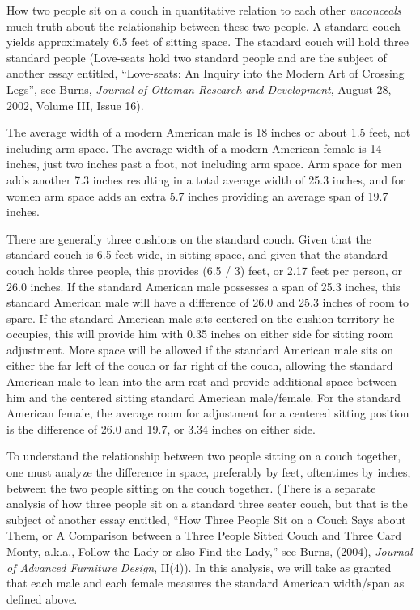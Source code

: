 \documentclass[12pt]{article}
\begin{document}

How two people sit on a couch in quantitative relation to each
other \textit{unconceals} much truth about the relationship
between these two people. A standard couch yields approximately
6.5 feet of sitting space. The standard couch will hold three
standard people (Love-seats hold two standard people and are the
subject of another essay entitled, ``Love-seats: An Inquiry into
the Modern Art of Crossing Legs'', see Burns, \textit{Journal of
Ottoman Research and Development}, August 28, 2002, Volume III,
Issue 16).


The average width of a modern American male is 18 inches or about
1.5 feet, not including arm space. The average width of a modern
American female is 14 inches, just two inches past a foot, not
including arm space.  Arm space for men adds another 7.3 inches
resulting in a total average width of 25.3 inches, and for women
arm space adds an extra 5.7 inches providing an average span of
19.7 inches.

There are generally three cushions on the standard couch. Given
that the standard couch is 6.5 feet wide, in sitting space, and
given that the standard couch holds three people, this provides
(6.5 / 3) feet, or 2.17 feet per person, or 26.0 inches. If the
standard American male possesses a span of 25.3 inches, this
standard American male will have a difference of 26.0 and 25.3
inches of room to spare. If the standard American male sits
centered on the cushion territory he occupies, this will provide
him with 0.35 inches on either side for sitting room adjustment.
More space will be allowed if the standard American male sits on
either the far left of the couch or far right of the couch,
allowing the standard American male to lean into the arm-rest and
provide additional space between him and the centered sitting
standard American male/female. For the standard American female,
the average room for adjustment for a centered sitting position is
the difference of 26.0 and 19.7, or 3.34 inches on either side.

To understand the relationship between two people sitting on a
couch together, one must analyze the difference in space,
preferably by feet, oftentimes by inches, between the two people
sitting on the couch together. (There is a separate analysis of
how three people sit on a standard three seater couch, but that is
the subject of another essay entitled, ``How Three People Sit on a
Couch Says about Them, or A Comparison between a Three People
Sitted Couch and Three Card Monty, a.k.a., Follow the Lady or also
Find the Lady,'' see Burns, (2004), \textit{Journal of Advanced
Furniture Design}, II(4)). In this analysis, we will take as
granted that each male and each female measures the standard
American width/span as defined above.
\end{document}
